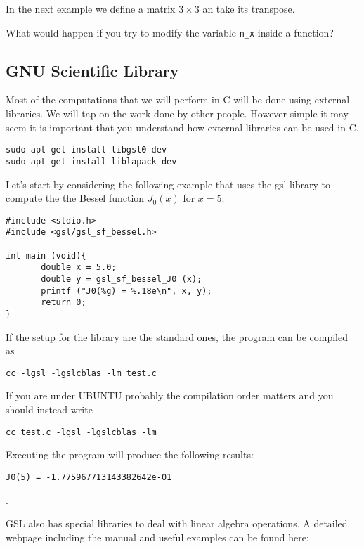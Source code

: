 \documentclass{article}
\begin{document}
In the next example we define a matrix $3\times3$ an take its transpose.



What would happen if you try to modify the variable \verb"n_x" inside a function?

\subsection{GNU Scientific Library}

Most of the computations that we will perform in C will be done using
external libraries. We will tap on the work done by other
people. However simple it may seem it is important that you understand
how external libraries can be used in C.  

\begin{verbatim}
sudo apt-get install libgsl0-dev
sudo apt-get install liblapack-dev
\end{verbatim}

Let's start by considering the following example that uses the gsl
library to compute the the Bessel function $J_{0}(x)$ for $x=5$: 

\begin{verbatim}
#include <stdio.h>
#include <gsl/gsl_sf_bessel.h>
     
int main (void){
       double x = 5.0;
       double y = gsl_sf_bessel_J0 (x);
       printf ("J0(%g) = %.18e\n", x, y);
       return 0;
}
\end{verbatim}

If the setup for the library are the standard ones, the program can be compiled as

\begin{verbatim}
cc -lgsl -lgslcblas -lm test.c 
\end{verbatim}



If you are under UBUNTU probably the compilation order matters and you
should instead write 

\begin{verbatim}
cc test.c -lgsl -lgslcblas -lm 
\end{verbatim}

Executing the program will produce the following results:

\begin{verbatim}
J0(5) = -1.775967713143382642e-01
\end{verbatim}.


GSL also has special libraries to deal with linear algebra operations. A detailed webpage including the manual and useful examples can be found here:
\end{document}
